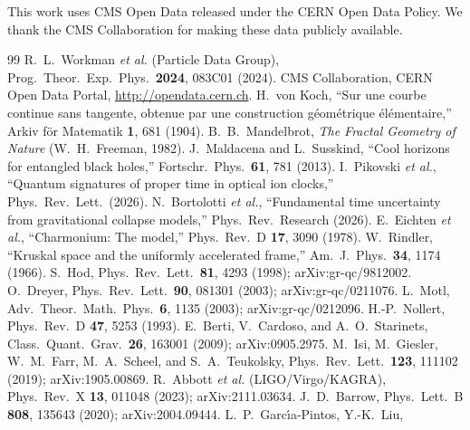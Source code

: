 \documentclass[twocolumn,showpacs,preprintnumbers,amsmath,amssymb,prl]{revtex4-2}
\begin{document}
\begin{acknowledgments}
This work uses CMS Open Data released under the CERN Open Data Policy.
We thank the CMS Collaboration for making these data publicly available.
\end{acknowledgments}

\begin{thebibliography}{99}
 R.~L.~Workman \textit{et al.} (Particle Data Group),
    Prog.\ Theor.\ Exp.\ Phys.\ \textbf{2024}, 083C01 (2024).
 CMS Collaboration, CERN Open Data Portal,
    \url{http://opendata.cern.ch}.
 H.~von Koch, ``Sur une courbe continue sans tangente,
    obtenue par une construction g\'{e}om\'{e}trique \'{e}l\'{e}mentaire,''
    Arkiv f\"or Matematik \textbf{1}, 681 (1904).
 B.~B.~Mandelbrot, \textit{The Fractal Geometry of
    Nature} (W.~H.~Freeman, 1982).
 J.~Maldacena and L.~Susskind,
    ``Cool horizons for entangled black holes,''
    Fortschr.\ Phys.\ \textbf{61}, 781 (2013).
 I.~Pikovski \textit{et al.},
    ``Quantum signatures of proper time in optical ion clocks,''
    Phys.\ Rev.\ Lett.\ (2026).
 N.~Bortolotti \textit{et al.},
    ``Fundamental time uncertainty from gravitational collapse models,''
    Phys.\ Rev.\ Research (2026).
 E.~Eichten \textit{et al.},
    ``Charmonium: The model,''
    Phys.\ Rev.\ D \textbf{17}, 3090 (1978).
 W.~Rindler,
    ``Kruskal space and the uniformly accelerated frame,''
    Am.\ J.\ Phys.\ \textbf{34}, 1174 (1966).
 S.~Hod,
    Phys.\ Rev.\ Lett.\ \textbf{81}, 4293 (1998);
    arXiv:gr-qc/9812002.
 O.~Dreyer,
    Phys.\ Rev.\ Lett.\ \textbf{90}, 081301 (2003);
    arXiv:gr-qc/0211076.
 L.~Motl,
    Adv.\ Theor.\ Math.\ Phys.\ \textbf{6}, 1135 (2003);
    arXiv:gr-qc/0212096.
 H.-P.~Nollert,
    Phys.\ Rev.\ D \textbf{47}, 5253 (1993).
 E.~Berti, V.~Cardoso, and A.~O.~Starinets,
    Class.\ Quant.\ Grav.\ \textbf{26}, 163001 (2009);
    arXiv:0905.2975.
 M.~Isi, M.~Giesler, W.~M.~Farr, M.~A.~Scheel,
    and S.~A.~Teukolsky,
    Phys.\ Rev.\ Lett.\ \textbf{123}, 111102 (2019);
    arXiv:1905.00869.
 R.~Abbott \textit{et al.} (LIGO/Virgo/KAGRA),
    Phys.\ Rev.\ X \textbf{13}, 011048 (2023);
    arXiv:2111.03634.
 J.~D.~Barrow,
    Phys.\ Lett.\ B \textbf{808}, 135643 (2020);
    arXiv:2004.09444.
 L.~P.~Garc\'{\i}a-Pintos, Y.-K.~Liu,

\end{thebibliography}
\end{document}

